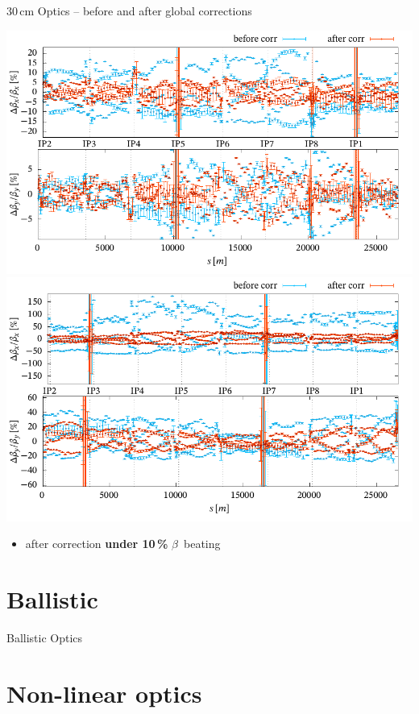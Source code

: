 \documentclass[4pt,usenames,dvipsnames,aspectratio=169]{beamer}
\newcommand{\highl}[1]{\textbf{#1}}
\begin{document}
\begin{frame}{30\,cm Optics -- before and after global corrections}

    \begin{center}
    \includegraphics[width=0.49\linewidth]{images/squeeze/b1_bb_comp_after_global.pdf}
    \hfill
    \includegraphics[width=0.49\linewidth]{images/squeeze/b2_bb_comp.pdf}
    \end{center}
    
    \begin{itemize}
        \item after correction \highl{under 10\,\%} $\beta$~beating
    \end{itemize}
    
\end{frame}


\section{Ballistic}
\begin{frame}{Ballistic Optics}
    
\end{frame}


\section{Non-linear optics}
\end{document}
